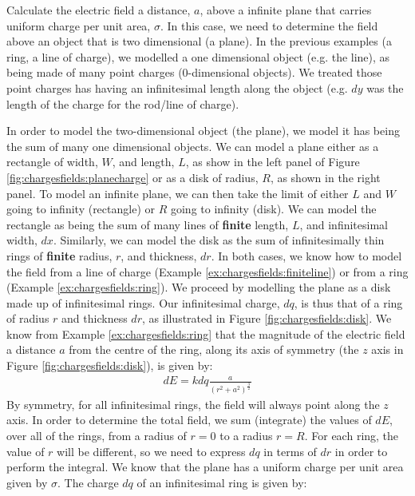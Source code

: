 \begin{example}{Calculate the electric field a distance, $a$, above a infinite plane that carries uniform charge per unit area, $\sigma$.}
In this case, we need to determine the field above an object that is two dimensional (a plane). In the previous examples (a ring, a line of charge), we modelled a one dimensional object (e.g. the line), as being made of many point charges (0-dimensional objects). We treated those point charges has having an infinitesimal length along the object (e.g. $dy$ was the length of the charge for the rod/line of charge).
 
In order to model the two-dimensional object (the plane), we model it has being the sum of many one dimensional objects. We can model a plane either as a rectangle of width, $W$, and length, $L$, as show in the left panel of Figure \ref{fig:chargesfields:planecharge} or as a disk of radius, $R$, as shown in the right panel. To model an infinite plane, we can then take the limit of either $L$ and $W$ going to infinity (rectangle) or $R$ going to infinity (disk). We can model the rectangle as being the sum of many lines of \textbf{finite} length, $L$, and infinitesimal width, $dx$. Similarly, we can model the disk as the sum of infinitesimally thin rings of \textbf{finite} radius, $r$, and thickness, $dr$. In both cases, we know how to model the field from a line of charge (Example \ref{ex:chargesfields:finiteline}) or from a ring (Example \ref{ex:chargesfields:ring}). 
We proceed by modelling the plane as a disk made up of infinitesimal rings. Our infinitesimal charge, $dq$, is thus that of a ring of radius $r$ and thickness $dr$, as illustrated in Figure \ref{fig:chargesfields:disk}.
We know from Example \ref{ex:chargesfields:ring} that the magnitude of the electric field a distance $a$ from the centre of the ring, along its axis of symmetry (the $z$ axis in Figure \ref{fig:chargesfields:disk}), is given by:
\begin{align*}
dE = kdq\frac{a}{(r^2+a^2)^\frac{3}{2}} 
\end{align*}
By symmetry, for all infinitesimal rings, the field will always point along the $z$ axis. In order to determine the total field, we sum (integrate) the values of $dE$, over all of the rings, from a radius of $r=0$ to a radius $r=R$. For each ring, the value of $r$ will be different, so we need to express $dq$ in terms of $dr$ in order to perform the integral. We know that the plane has a uniform charge per unit area given by $\sigma$. The charge $dq$ of an infinitesimal ring is given by:

\end{example}
